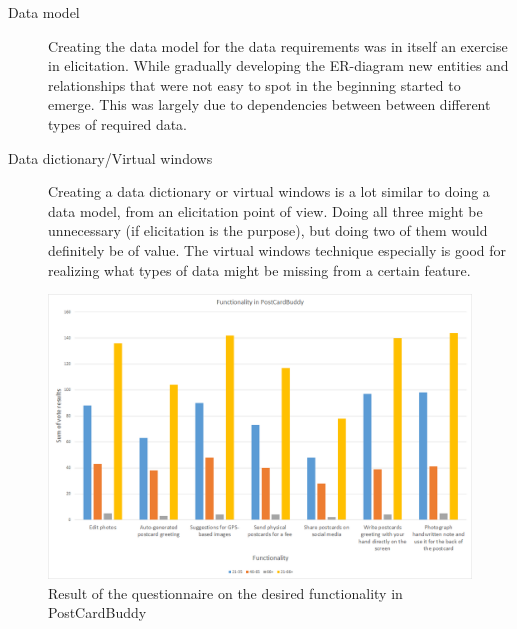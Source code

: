 \documentclass[10pt,a4paper]{article}
\begin{document}
\begin{description}
\item[Data model] Creating the data model for the data requirements was in itself an exercise in elicitation. While gradually developing the ER-diagram new entities and relationships that were not easy to spot in the beginning started to emerge. This was largely due to dependencies between between different types of required data.

\item[Data dictionary/Virtual windows] Creating a data dictionary or virtual windows is a lot similar to doing a data model, from an elicitation point of view. Doing all three might be unnecessary (if elicitation is the purpose), but doing two of them would definitely be of value. The virtual windows technique especially is good for realizing what types of data might be missing from a certain feature.
\end{description}


\begin{figure}[h!]
\centering
\includegraphics[width=1.0\textwidth]{questionnaire.png}
\caption{Result of the questionnaire on the desired functionality in PostCardBuddy}
\label{fig:questionnaire}
\end{figure}


\end{document}
